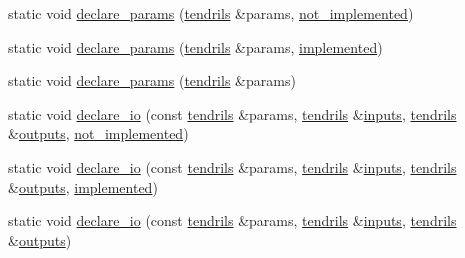 \begin{DoxyCompactItemize}
static void \hyperlink{structecto_1_1cell___a6a36edc8e9eddadfe6486460bab93c93}{declare\-\_\-params} (\hyperlink{classecto_1_1tendrils}{tendrils} \&params, \hyperlink{structecto_1_1cell___a3e48e52421d132bb2bb4e343f771abeb}{not\-\_\-implemented})
\item 
static void \hyperlink{structecto_1_1cell___a9673540d6196cfa4e40be503c397b1ac}{declare\-\_\-params} (\hyperlink{classecto_1_1tendrils}{tendrils} \&params, \hyperlink{structecto_1_1cell___a63c5c3dd95630a508017730ee345c23a}{implemented})
\item 
static void \hyperlink{structecto_1_1cell___a4de6c39213d7b583f295c4cb042c1f70}{declare\-\_\-params} (\hyperlink{classecto_1_1tendrils}{tendrils} \&params)
\item 
static void \hyperlink{structecto_1_1cell___ac08370823fea8ed7f5991e369f6a7fa7}{declare\-\_\-io} (const \hyperlink{classecto_1_1tendrils}{tendrils} \&params, \hyperlink{classecto_1_1tendrils}{tendrils} \&\hyperlink{structecto_1_1cell_a65099b0458a7761b8bfa7a1ddc17e92f}{inputs}, \hyperlink{classecto_1_1tendrils}{tendrils} \&\hyperlink{structecto_1_1cell_a93951743b603faba35312ebdb07ceb22}{outputs}, \hyperlink{structecto_1_1cell___a3e48e52421d132bb2bb4e343f771abeb}{not\-\_\-implemented})
\item 
static void \hyperlink{structecto_1_1cell___a20deeac5a09b3a7abaee924f361cbb3b}{declare\-\_\-io} (const \hyperlink{classecto_1_1tendrils}{tendrils} \&params, \hyperlink{classecto_1_1tendrils}{tendrils} \&\hyperlink{structecto_1_1cell_a65099b0458a7761b8bfa7a1ddc17e92f}{inputs}, \hyperlink{classecto_1_1tendrils}{tendrils} \&\hyperlink{structecto_1_1cell_a93951743b603faba35312ebdb07ceb22}{outputs}, \hyperlink{structecto_1_1cell___a63c5c3dd95630a508017730ee345c23a}{implemented})
\item 
static void \hyperlink{structecto_1_1cell___a542f293d31fdd0df4a4414d7b706ef7e}{declare\-\_\-io} (const \hyperlink{classecto_1_1tendrils}{tendrils} \&params, \hyperlink{classecto_1_1tendrils}{tendrils} \&\hyperlink{structecto_1_1cell_a65099b0458a7761b8bfa7a1ddc17e92f}{inputs}, \hyperlink{classecto_1_1tendrils}{tendrils} \&\hyperlink{structecto_1_1cell_a93951743b603faba35312ebdb07ceb22}{outputs})
\end{DoxyCompactItemize}
